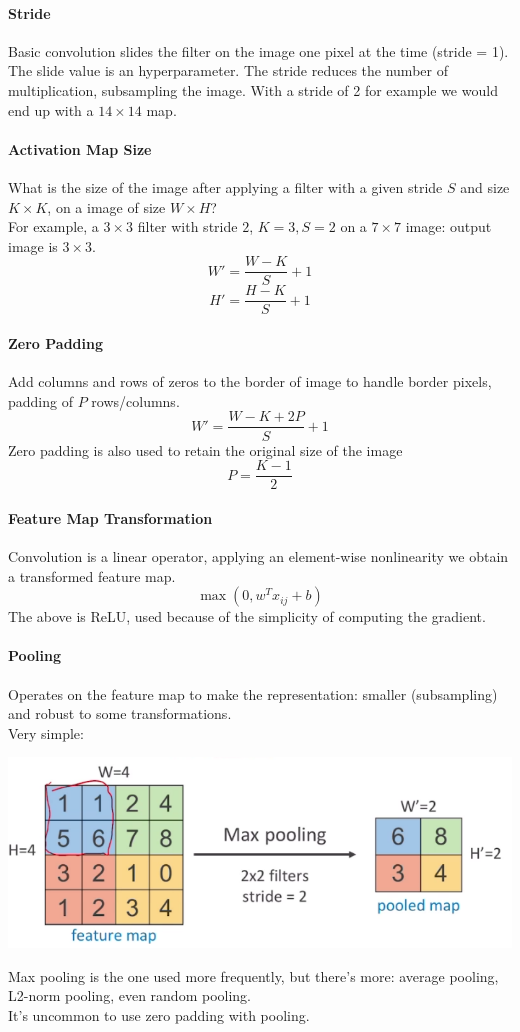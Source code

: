 \documentclass[10pt]{report}
\begin{document}
\paragraph{Stride} Basic convolution slides the filter on the image one pixel at the time (stride = 1). The slide value is an hyperparameter. The stride reduces the number of multiplication, subsampling the image. With a stride of 2 for example we would end up with a $14\times14$ map.
\paragraph{Activation Map Size} What is the size of the image after applying a filter with a given stride $S$ and size $K\times K$, on a image of size $W\times H$?\\
For example, a $3\times 3$ filter with stride $2$, $K=3, S=2$ on a $7\times 7$ image: output image is $3\times 3$.
$$W'=\frac{W-K}{S}+1$$
$$H'=\frac{H-K}{S}+1$$
\paragraph{Zero Padding} Add columns and rows of zeros to the border of image to handle border pixels, padding of $P$ rows/columns.
$$W'=\frac{W-K+2P}{S}+1$$
Zero padding is also used to retain the original size of the image
$$P=\frac{K-1}{2}$$
\paragraph{Feature Map Transformation} Convolution is a linear operator, applying an element-wise nonlinearity we obtain a transformed feature map.
$$\max(0, w^Tx_{ij} + b)$$
The above is ReLU, used because of the simplicity of computing the gradient.
\paragraph{Pooling} Operates on the feature map to make the representation: smaller (subsampling) and robust to some transformations.\\
Very simple: \begin{center}
	\includegraphics[scale=0.5]{54.png}
\end{center}
Max pooling is the one used more frequently, but there's more: average pooling, L2-norm pooling, even random pooling.\\
It's uncommon to use zero padding with pooling.
\end{document}
